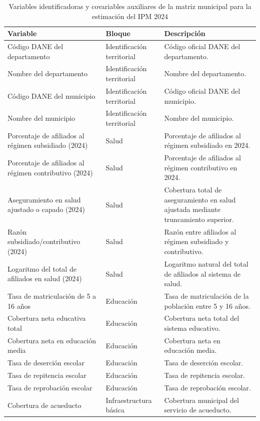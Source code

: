\begin{table}[H]
\centering
\small
\caption{Variables identificadoras y covariables auxiliares de la matriz municipal para la estimación del IPM 2024}
\label{tab:matriz-auxiliar-ipm}
\renewcommand{\arraystretch}{1.25}
\begin{tabular}{p{4.2cm} p{2.6cm} p{6.2cm}}
\hline
\textbf{Variable} & \textbf{Bloque} & \textbf{Descripción} \\
\hline
Código DANE del departamento & Identificación territorial & Código oficial DANE del departamento. \\
Nombre del departamento & Identificación territorial & Nombre del departamento. \\
Código DANE del municipio & Identificación territorial & Código oficial DANE del municipio. \\
Nombre del municipio & Identificación territorial & Nombre del municipio. \\
Porcentaje de afiliados al régimen subsidiado (2024) & Salud & Porcentaje de afiliados al régimen subsidiado en 2024. \\
Porcentaje de afiliados al régimen contributivo (2024) & Salud & Porcentaje de afiliados al régimen contributivo en 2024. \\
Aseguramiento en salud ajustado o capado (2024) & Salud & Cobertura total de aseguramiento en salud ajustada mediante truncamiento superior. \\
Razón subsidiado/contributivo (2024) & Salud & Razón entre afiliados al régimen subsidiado y contributivo. \\
Logaritmo del total de afiliados en salud (2024) & Salud & Logaritmo natural del total de afiliados al sistema de salud. \\
Tasa de matriculación de 5 a 16 años & Educación & Tasa de matriculación de la población entre 5 y 16 años. \\
Cobertura neta educativa total & Educación & Cobertura neta total del sistema educativo. \\
Cobertura neta en educación media & Educación & Cobertura neta en educación media. \\
Tasa de deserción escolar & Educación & Tasa de deserción escolar. \\
Tasa de repitencia escolar & Educación & Tasa de repitencia escolar. \\
Tasa de reprobación escolar & Educación & Tasa de reprobación escolar. \\
Cobertura de acueducto & Infraestructura básica & Cobertura municipal del servicio de acueducto. \\

\end{tabular}
\end{table}
